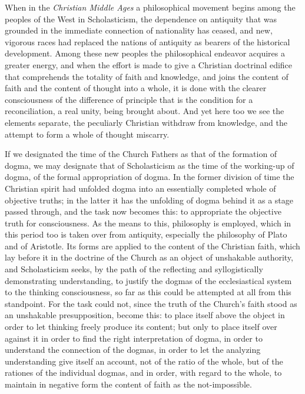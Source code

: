 When in the \emph{Christian Middle Ages} a philosophical movement begins among the peoples of the West in Scholasticism, the dependence on antiquity that was grounded in the immediate connection of nationality has ceased, and new, vigorous races had replaced the nations of antiquity as bearers of the historical development. Among these new peoples the philosophical endeavor acquires a greater energy, and when the effort is made to give a Christian doctrinal edifice that comprehends the totality of faith and knowledge, and joins the content of faith and the content of thought into a whole, it is done with the clearer consciousness of the difference of principle that is the condition for a reconciliation, a real unity, being brought about. And yet here too we see the elements separate, the peculiarly Christian withdraw from knowledge, and the attempt to form a whole of thought miscarry.

If we designated the time of the Church Fathers as that of the formation of dogma, we may designate that of Scholasticism as the time of the working-up of dogma, of the formal appropriation of dogma. In the former division of time the Christian spirit had unfolded dogma into an essentially completed whole of objective truths; in the latter it has the unfolding of dogma behind it as a stage passed through, and the task now becomes this: to appropriate the objective truth for consciousness. As the means to this, philosophy is employed, which in this period too is taken over from antiquity, especially the philosophy of Plato and of Aristotle. Its forms are applied to the content of the Christian faith, which lay before it in the doctrine of the Church as an object of unshakable authority, and Scholasticism seeks, by the path of the reflecting and syllogistically demonstrating understanding, to justify the dogmas of the ecclesiastical system to the thinking consciousness, so far as this could be attempted at all from this standpoint. For the task could not, since the truth of the Church's faith stood as an unshakable presupposition, become this: to place itself above the object in order to let thinking freely produce its content; but only to place itself over against it in order to find the right interpretation of dogma, in order to understand the connection of the dogmas, in order to let the analyzing understanding give itself an account, not of the ratio of the whole, but of the rationes of the individual dogmas, and in order, with regard to the whole, to maintain in negative form the content of faith as the not-impossible.

